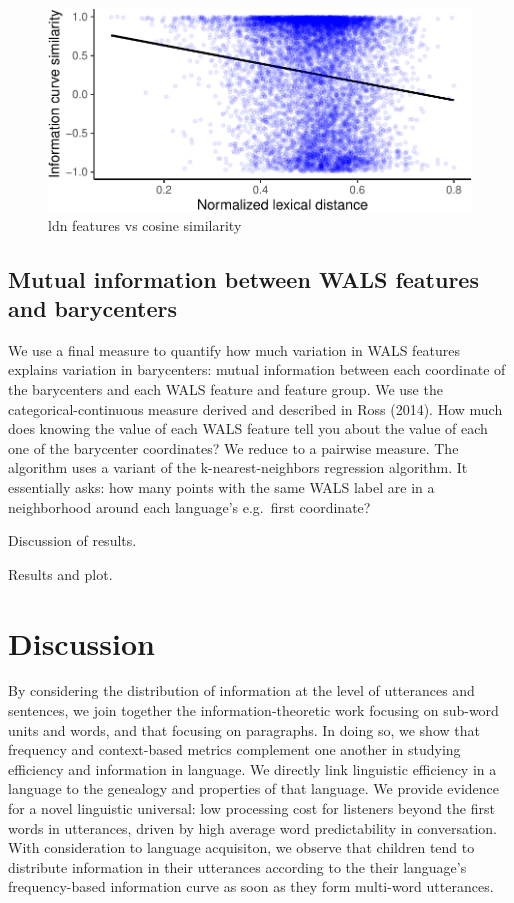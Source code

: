 \documentclass[man,floatsintext]{apa6}
\begin{document}
\begin{figure}
\centering
\includegraphics{figs/cosine-ldn-1.pdf}
\caption{\label{fig:cosine-ldn}ldn features vs cosine similarity}
\end{figure}

\hypertarget{mutual-information-between-wals-features-and-barycenters}{%
\subsection{Mutual information between WALS features and barycenters}\label{mutual-information-between-wals-features-and-barycenters}}

We use a final measure to quantify how much variation in WALS features explains variation in barycenters: mutual information between each coordinate of the barycenters and each WALS feature and feature group. We use the categorical-continuous measure derived and described in Ross (2014). How much does knowing the value of each WALS feature tell you about the value of each one of the barycenter coordinates? We reduce to a pairwise measure. The algorithm uses a variant of the k-nearest-neighbors regression algorithm. It essentially asks: how many points with the same WALS label are in a neighborhood around each language's e.g.~first coordinate?

Discussion of results.

Results and plot.

\hypertarget{discussion}{%
\section{Discussion}\label{discussion}}

By considering the distribution of information at the level of utterances and sentences, we join together the information-theoretic work focusing on sub-word units and words, and that focusing on paragraphs. In doing so, we show that frequency and context-based metrics complement one another in studying efficiency and information in language. We directly link linguistic efficiency in a language to the genealogy and properties of that language. We provide evidence for a novel linguistic universal: low processing cost for listeners beyond the first words in utterances, driven by high average word predictability in conversation. With consideration to language acquisiton, we observe that children tend to distribute information in their utterances according to the their language's frequency-based information curve as soon as they form multi-word utterances.
\end{document}

